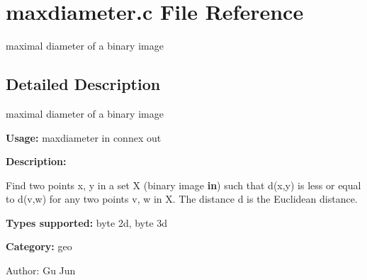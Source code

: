 \section{maxdiameter.c File Reference}
\label{maxdiameter_8c}
maximal diameter of a binary image  




\label{_details}
\subsection{Detailed Description}
maximal diameter of a binary image 

{\bf Usage:} maxdiameter in connex out

{\bf Description:}

Find two points x, y in a set X (binary image {\bf in}) such that d(x,y) is less or equal to d(v,w) for any two points v, w in X. The distance d is the Euclidean distance.

{\bf Types supported:} byte 2d, byte 3d

{\bf Category:} geo

\begin{Desc}
\item[Author:]Gu Jun \end{Desc}
